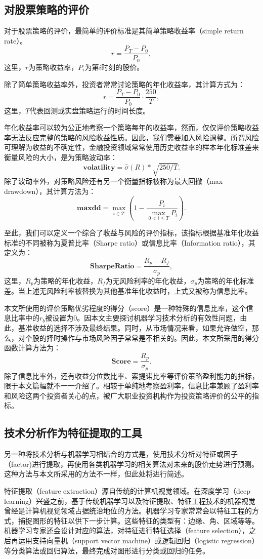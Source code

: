 \documentclass[twoside,longtitle]{LZUthesis}
\begin{document}
\subsection{对股票策略的评价}
对于股票策略的评价，最简单的评价标准是其简单策略收益率（simple return rate）。
\[
r=\frac{P_T-P_0}{P_0},
\]
这里，$r$为策略收益率，$P_i$为第$i$时刻的股价。

除了简单策略收益率外，投资者常常讨论策略的年化收益率，其计算方式为：
\[
r=\frac{P_T-P_0}{P_0}\cdot \frac{250}{T},
\]
这里，$T$代表回测或实盘策略运行的时间长度。

年化收益率可以较为公正地考察一个策略每年的收益率，然而，仅仅评价策略收益率无法反应完整的策略的风险收益性质。因此，我们需要加入风险调整。所谓风险可理解为收益的不确定性，金融投资领域常常使用历史收益率的样本年化标准差来衡量风险的大小，是为策略波动率：
\[
\mathbf{volatility}=\hat{\sigma}(R)*\sqrt{250/T}.
\]
除了波动率外，对策略风险还有另一个衡量指标被称为最大回撤（max drawdown），其计算方法为：
\[
\mathbf{max dd}=\max_{i\in\mathcal{T}}\left(1-\frac{P_i}{\max_{0<i\le T}P_i }\right).
\]

至此，我们可以定义一个综合了收益与风险的评价指标，该指标根据基准年化收益标准的不同被称为夏普比率（Sharpe ratio）或信息比率（Information ratio）\cite{sharpe1994sharpe}，其定义为：
\[
\mathbf{SharpeRatio}=\frac{R_p-R_f}{\sigma_p},
\]
这里，$R_p$为策略的年化收益，$R_f$为无风险利率的年化收益，$\sigma_p$为策略的年化标准差。当上述无风险利率被替换为其他基准年化收益时，上式又被称为信息比率。

本文所使用的评价策略优劣程度的得分（score）是一种特殊的信息比率，这个信息比率中的$r_b$被设置为0。因本文主要探讨机器学习技术分析的有效性问题，由此，基准收益的选择不涉及最终结果。同时，从市场情况来看，如果允许做空，那么，对个股的择时操作与市场风险因子常常是不相关的。因此，本文所采用的得分函数计算方法为：
\[
\mathbf{Score}=\frac{R_p}{\sigma_p}.
\]
除了信息比率外，还有收益分位数比率、索提诺比率等评价策略盈利能力的指标，限于本文篇幅就不一一介绍了。相较于单纯地考察盈利率，信息比率兼顾了盈利率和风险这两个投资者关心的点，被广大职业投资机构作为投资策略评价的公平的指标。

\subsection{技术分析作为特征提取的工具}
另一种将技术分析与机器学习相结合的方式是，使用技术分析对特征或因子（factor)进行提取，再使用各类机器学习的相关算法对未来的股价走势进行预测。这种方法与本文所采用的方法不一样，但此处将进行简述。

特征提取（feature extraction）源自传统的计算机视觉领域。在深度学习（deep learning）兴盛之前，基于传统机器学习以及特征提取、特征工程技术的机器视觉曾经是计算机视觉领域占据统治地位的方法\cite{sarkar1985feature}。机器学习专家常常会以特征工程的方式，捕捉图形的特征以供下一步计算。这些特征的类型有：边缘、角、区域等等。机器学习专家还会设计对应的算法，对特征进行特征选择（feature selection），之后再运用支持向量机（support vector machine）或逻辑回归（logistic regression）等分类算法或回归算法，最终完成对图形进行分类或回归的任务。
\end{document}
